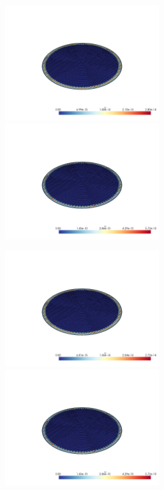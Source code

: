 \documentclass[
  11pt,
]{article}
\let\origfigure\figure
\let\endorigfigure\endfigure
\renewenvironment{figure}[1][2] {
    \expandafter\origfigure\expandafter[H]
} {
    \endorigfigure
}
\begin{document}
\begin{figure}
\caption{Finite element error in the L2 and H1 norms/seminorms, respectively for problem 1 over mesh number 4 using order 2 quadrature.}
\end{figure}

\includegraphics[width=0.5\textwidth,height=\textheight]{../img/mesh4-gauss05-L2.png}
\includegraphics[width=0.5\textwidth,height=\textheight]{../img/mesh4-gauss05-H1.png}

\begin{figure}
\caption{Finite element error in the L2 and H1 norms/seminorms, respectively for problem 1 over mesh number 4 using order 5 quadrature.}
\end{figure}

\includegraphics[width=0.5\textwidth,height=\textheight]{../img/mesh4-gauss08-L2.png}
\includegraphics[width=0.5\textwidth,height=\textheight]{../img/mesh4-gauss08-H1.png}
\end{document}
